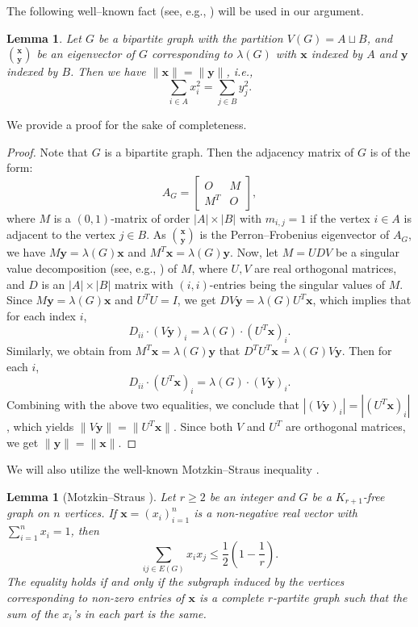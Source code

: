 \documentclass[11pt,a4paper]{article}
\newtheorem{lemma}[theorem]{Lemma}
\theoremstyle{definition}
\theoremstyle{remark}
\begin{document}
The following well--known fact (see, e.g., \cite{BFP2008}) will be used in our argument. 

\begin{lemma} \label{lem-square-equal}
  Let $G$ be a bipartite graph with the partition $V(G)=A\sqcup B$, and $\binom{\bm{x}}{ \bm{y}}$ be an eigenvector of $G$ corresponding to $\lambda (G)$ with $\bm{x}$ indexed by $A$ and $\bm{y}$ indexed by $B$. Then we have $\lVert \bm{x}\rVert = \lVert \bm{y}\rVert$, i.e., 
  \[ \sum_{i\in A} x_i^2 = \sum_{j\in B} y_j^2. \]  
\end{lemma}

We provide a proof for the sake of completeness. 

\begin{proof}
  Note that $G$ is a bipartite graph. Then the adjacency matrix of $G$ is of the form:   
    \[  A_G=\begin{bmatrix} O & M \\ M^{T} & O \end{bmatrix}, \]
    where $M$ is a $(0,1)$-matrix of order $|A|\times |B|$ with 
    $m_{i,j}=1$ if the vertex $i\in A$ is adjacent to the vertex $j\in B$. As $\binom{\bm{x}}{\bm{y}}$ is the Perron--Frobenius eigenvector of $A_G$, we have 
    $M\bm{y} = \lambda(G) \bm{x}$ and 
    $M^{T}\bm{x}=\lambda(G) \bm{y}$. 
    Now, let $M=UDV$ be a singular value decomposition (see, e.g., \cite[p. 15]{Zhan2013}) of $M$, where $U,V$ are real orthogonal matrices, and $D$ is an $|A|\times |B|$ matrix with $(i,i)$-entries being the  singular values of $M$. Since $M\bm{y} = \lambda (G) \bm{x}$ and $U^TU=I$, we get  $DV\bm{y}=\lambda (G) U^{T} \bm{x}$, which implies that for each index $i$, 
    \[ D_{ii} \cdot (V\bm{y})_i =\lambda (G) \cdot (U^T\bm{x})_i.  \]
   Similarly, we obtain from $M^{T}\bm{x}= \lambda (G) \bm{y}$ that $D^TU^T \bm{x}= \lambda (G) V\bm{y}$. Then for each $i$, 
   \[ D_{ii} \cdot (U^T\bm{x})_i=\lambda (G)\cdot (V\bm{y})_i. \]
   Combining with the above two equalities, 
   we conclude that $|(V\bm{y})_i| = |(U^T\bm{x})_i|$, which yields  
    $\lVert V\bm{y}\rVert = \lVert U^T\bm{x}\rVert$. Since both $V$ and $U^T$ are orthogonal matrices, we get $\lVert \bm{y}\rVert = \lVert \bm{x}\rVert$. 
\end{proof}

We will also utilize the well-known Motzkin--Straus inequality \cite{MS1965}. 

\begin{lemma}[Motzkin--Straus \cite{MS1965}] \label{lem-MS} 
Let $r\ge 2$ be an integer and $G$ be a $K_{r+1}$-free graph on $n$ vertices. 
    If $\bm{x}=(x_i)_{i=1}^n$ is a non-negative real vector with 
$\sum_{i=1}^n x_i =1$, then 
\begin{equation*}
\sum_{ij \in E(G)} x_ix_j \le \frac{1}{2}\left( 1- \frac{1}{r} \right).
\end{equation*} 
The equality holds if and only if the subgraph induced by the vertices corresponding to non-zero entries of $\bm{x}$ is a complete $r$-partite graph such that the sum of the $x_i$'s in each part is the same. 
\end{lemma}
\end{document}
